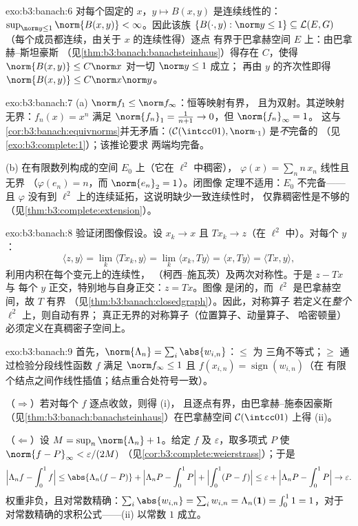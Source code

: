 \begin{solution}{exo:b3:banach:6}
对每个固定的 $x$，$y \mapsto B(x, y)$ 是连续线性的：
$\sup_{\norm y \leq 1}\norm{B(x,y)} < \infty$。因此该族
$\{B(\cdot, y) : \norm y \leq 1\} \subseteq \mathcal L(E, G)$
（每个成员都连续，由关于 $x$ 的连续性得）逐点
有界于巴拿赫空间 $E$ 上：由巴拿赫–斯坦豪斯
（见\cref{thm:b3:banach:banachsteinhaus}）得存在 $C$，使得
$\norm{B(x,y)} \leq C\norm x$ 对一切 $\norm y \leq 1$ 成立；
再由 $y$ 的齐次性即得 $\norm{B(x,y)} \leq
C\norm x\norm y$。
\end{solution}

\begin{solution}{exo:b3:banach:7}
(a) $\norm f_1 \leq \norm f_\infty$：恒等映射有界，
且为双射。其逆映射无界：$f_n(x) = x^n$ 满足
$\norm{f_n}_1 = \frac1{n+1} \to 0$，但 $\norm{f_n}_\infty = 1$。
这与\cref{cor:b3:banach:equivnorms}并无矛盾：$(\mathcal
C(\intcc01), \norm\cdot_1)$ 是\emph{不}完备的
（见\cref{exo:b3:complete:1}）；该推论要求
两端均完备。

(b) 在有限数列构成的空间 $E_0$ 上（它在 $\ell^2$ 中稠密），
$\varphi(x) = \sum_n n\,x_n$ 线性且无界
（$\varphi(e_n) = n$，而 $\norm{e_n}_2 = 1$）。闭图像
定理不适用：$E_0$ 不完备——且 $\varphi$
没有到 $\ell^2$ 上的连续延拓，这说明缺少一致连续性时，
仅靠稠密性是不够的
（见\cref{thm:b3:complete:extension}）。
\end{solution}

\begin{solution}{exo:b3:banach:8}
验证闭图像假设。设 $x_k \to x$ 且
$Tx_k \to z$（在 $\ell^2$ 中）。对每个 $y$：
\[
\langle z, y\rangle = \lim_k\langle Tx_k, y\rangle
= \lim_k \langle x_k, Ty\rangle = \langle x, Ty\rangle
= \langle Tx, y\rangle,
\]
利用内积在每个变元上的连续性，
（柯西–施瓦茨）及两次对称性。于是 $z - Tx$ 与
每个 $y$ 正交，特别地与自身正交：$z = Tx$。图像
是闭的，而 $\ell^2$ 是巴拿赫空间，故 $T$ 有界
（见\cref{thm:b3:banach:closedgraph}）。因此，对称算子
若定义在\emph{整个} $\ell^2$ 上，则自动有界；
真正无界的对称算子（位置算子、动量算子、
哈密顿量）必须定义在真稠密子空间上。
\end{solution}

\begin{solution}{exo:b3:banach:9}
首先，$\norm{\Lambda_n} = \sum_i\abs{w_{i,n}}$：$\leq$ 为
三角不等式；$\geq$ 通过检验分段线性函数 $f$
满足 $\norm f_\infty \leq 1$ 且 $f(x_{i,n}) =
\operatorname{sign}(w_{i,n})$（在
有限个结点之间作线性插值；结点重合处符号一致）。

（$\Rightarrow$）若对每个 $f$ 逐点收敛，则得 (i)，
且逐点有界，由巴拿赫–施泰因豪斯
（见\cref{thm:b3:banach:banachsteinhaus}）在巴拿赫空间 $\mathcal
C(\intcc01)$ 上得 (ii)。

（$\Leftarrow$）设 $M = \sup_n\norm{\Lambda_n} + 1$。给定 $f$
及 $\varepsilon$，取多项式 $P$ 使 $\norm{f -
P}_\infty < \varepsilon/(2M)$
（见\cref{cor:b3:complete:weierstrass}）；于是
\[
\Bigl|\Lambda_n f - \int_0^1 f\Bigr|
\leq \abs{\Lambda_n(f - P)} + \Bigl|\Lambda_nP -
\int_0^1P\Bigr| + \Bigl|\int_0^1(P - f)\Bigr|
\leq \varepsilon + \Bigl|\Lambda_nP - \int_0^1P\Bigr| \to
\varepsilon .
\]
权重非负，且对常数精确：$\sum_i\abs{w_{i,n}}
= \sum_iw_{i,n} = \Lambda_n(\mathbf 1) = \int_0^1 1 = 1$，对于
对常数精确的求积公式——(ii) 以常数 $1$ 成立。
\end{solution}

